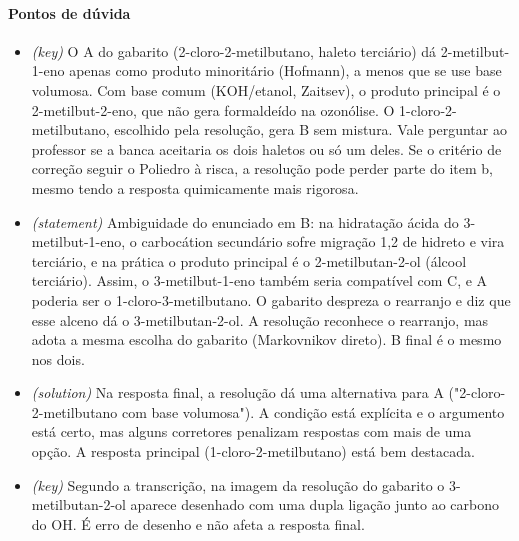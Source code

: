 \documentclass{article}%
\begin{document}
\paragraph{Pontos de dúvida}%
\begin{itemize}%
\item%
\textit{(key)} O A do gabarito (2{-}cloro{-}2{-}metilbutano, haleto terciário) dá 2{-}metilbut{-}1{-}eno apenas como produto minoritário (Hofmann), a menos que se use base volumosa. Com base comum (KOH/etanol, Zaitsev), o produto principal é o 2{-}metilbut{-}2{-}eno, que não gera formaldeído na ozonólise. O 1{-}cloro{-}2{-}metilbutano, escolhido pela resolução, gera B sem mistura. Vale perguntar ao professor se a banca aceitaria os dois haletos ou só um deles. Se o critério de correção seguir o Poliedro à risca, a resolução pode perder parte do item b, mesmo tendo a resposta quimicamente mais rigorosa.%
\item%
\textit{(statement)} Ambiguidade do enunciado em B: na hidratação ácida do 3{-}metilbut{-}1{-}eno, o carbocátion secundário sofre migração 1,2 de hidreto e vira terciário, e na prática o produto principal é o 2{-}metilbutan{-}2{-}ol (álcool terciário). Assim, o 3{-}metilbut{-}1{-}eno também seria compatível com C, e A poderia ser o 1{-}cloro{-}3{-}metilbutano. O gabarito despreza o rearranjo e diz que esse alceno dá o 3{-}metilbutan{-}2{-}ol. A resolução reconhece o rearranjo, mas adota a mesma escolha do gabarito (Markovnikov direto). B final é o mesmo nos dois.%
\item%
\textit{(solution)} Na resposta final, a resolução dá uma alternativa para A ("2{-}cloro{-}2{-}metilbutano com base volumosa"). A condição está explícita e o argumento está certo, mas alguns corretores penalizam respostas com mais de uma opção. A resposta principal (1{-}cloro{-}2{-}metilbutano) está bem destacada.%
\item%
\textit{(key)} Segundo a transcrição, na imagem da resolução do gabarito o 3{-}metilbutan{-}2{-}ol aparece desenhado com uma dupla ligação junto ao carbono do OH. É erro de desenho e não afeta a resposta final.%
\end{itemize}%
\end{document}
